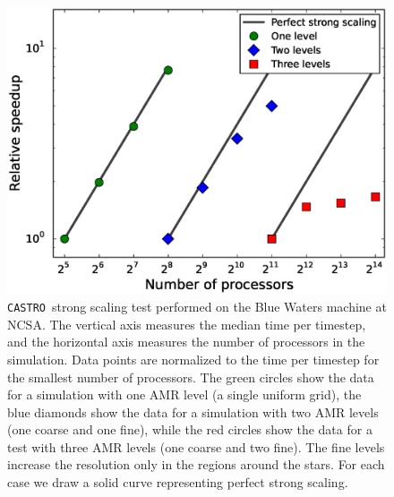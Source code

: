 \documentclass[iop]{../emulateapj}
\newcommand{\castro}{\texttt{CASTRO}}
\begin{document}
\begin{figure}
  \centering
  \includegraphics[scale=0.4]{plots/strong_scaling}
  \caption{\castro\ strong scaling test performed on the Blue Waters machine at
    NCSA. The vertical axis measures the median time per timestep, and the 
    horizontal axis measures the number of processors in the simulation. Data 
    points are normalized to the time per timestep for the smallest number 
    of processors. The green circles show the data for a simulation with one 
    AMR level (a single uniform grid), the blue diamonds show the data for a simulation with two AMR
    levels (one coarse and one fine), while the red circles show the data 
    for a test with three AMR levels (one coarse and two fine). The fine levels 
    increase the resolution only in the regions around the stars. For each case 
    we draw a solid curve representing perfect strong scaling.\label{fig:strong_scaling}}
\end{figure}
\end{document}
